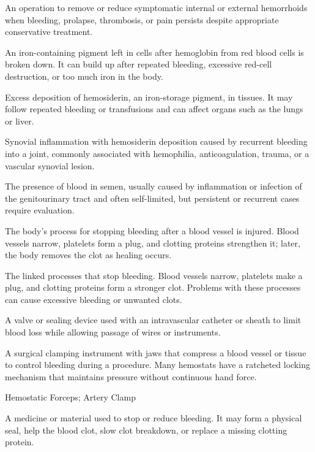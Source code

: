  An operation to remove or reduce symptomatic internal or external hemorrhoids when bleeding, prolapse, thrombosis, or pain persists despite appropriate conservative treatment.

 An iron-containing pigment left in cells after hemoglobin from red blood cells is broken down. It can build up after repeated bleeding, excessive red-cell destruction, or too much iron in the body.

 Excess deposition of hemosiderin, an iron-storage pigment, in tissues. It may follow repeated bleeding or transfusions and can affect organs such as the lungs or liver.

 Synovial inflammation with hemosiderin deposition caused by recurrent bleeding into a joint, commonly associated with hemophilia, anticoagulation, trauma, or a vascular synovial lesion.

 The presence of blood in semen, usually caused by inflammation or infection of the genitourinary tract and often self-limited, but persistent or recurrent cases require evaluation.

 The body’s process for stopping bleeding after a blood vessel is injured. Blood vessels narrow, platelets form a plug, and clotting proteins strengthen it; later, the body removes the clot as healing occurs.

 The linked processes that stop bleeding. Blood vessels narrow, platelets make a plug, and clotting proteins form a stronger clot. Problems with these processes can cause excessive bleeding or unwanted clots.

 A valve or sealing device used with an intravascular catheter or sheath to limit blood loss while allowing passage of wires or instruments.

 A surgical clamping instrument with jaws that compress a blood vessel or tissue to control bleeding during a procedure. Many hemostats have a ratcheted locking mechanism that maintains pressure without continuous hand force.

\synonyms
Hemostatic Forceps; Artery Clamp

 A medicine or material used to stop or reduce bleeding. It may form a physical seal, help the blood clot, slow clot breakdown, or replace a missing clotting protein.

